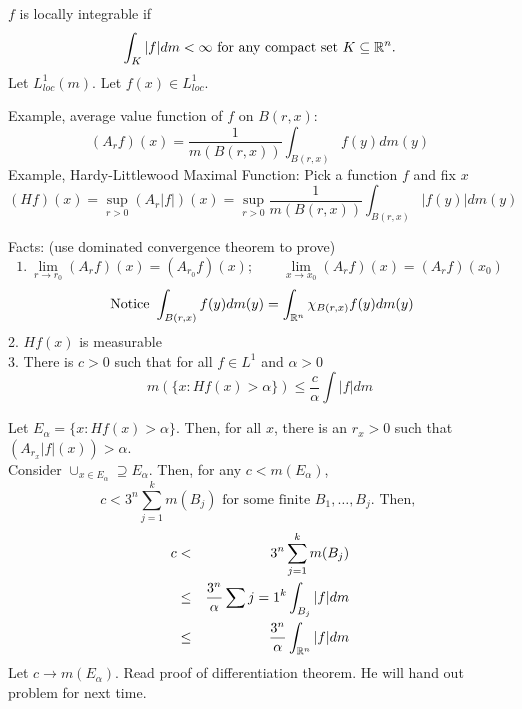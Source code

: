 \begin{dfn}
$f$ is locally integrable if 
\[
\int_K |f|d m < \infty \text{ for any compact set } K \subseteq {\mathbb R}^n. 
\]	
Let $L_{loc}^{1} (m)$. Let $f(x) \in L^{1}_{loc}$.
\end{dfn}
Example, average value function of $f$ on $B(r,x)$: $$ (A_r f )(x) = \frac{1}{m(B(r,x))} \int_{B(r,x)} f(y) dm(y)$$
Example, Hardy-Littlewood Maximal Function: Pick a function $f$ and fix $x$
$$
(Hf)(x) = \sup_{r>0}(A_r |f|)(x) = \sup_{r>0} \frac{1}{m(B(r,x))} \int_{B(r,x)} |f(y)| d m (y)
$$

Facts: (use dominated convergence theorem to prove)
\[
1. \ \lim_{r \rightarrow r_0} (A_r f)(x) = (A_{r_0}f)(x); \qquad \lim_{x \rightarrow x_0}(A_r f)(x) = (A_r f)(x_0)
\]
$$\text{ Notice  }\int_{B(r,x)}f(y)dm(y) = \int_{{\mathbb R}^n} \chi_{B(r,x)}f(y) dm(y)$$
2. $Hf(x)$ is measurable \\
3. There is $c> 0$ such that for all $f \in L^1$ and $\alpha > 0$
\[
m(\{ x: Hf(x)> \alpha \}) \leq \frac{c}{\alpha} \int |f| d m
\]
\begin{pf}[proof of 3]
	Let $E_\alpha = \{ x: Hf(x) > \alpha \}$. Then, for all $x$, there is an $r_x>0$ such that $(A_{r_x}|f|(x)) > \alpha$. \\
	Consider $\cup_{x \in E_{\alpha}} \supseteq E_{\alpha}$. Then, for any $c < m(E_{\alpha})$, 
	\[
	c < 3^n \sum_{j=1}^k m(B_j) \text{ for some finite } B_1, \dots, B_j. \text{ Then, }
	\] 
	\begin{eqnarray*}
	c & < & 	3^n \sum_{j=1}^k m(B_j) \\
	& \leq & \frac{3^n}{\alpha} \sum{j=1}^k \int_{B_j} |f| d m \\
	& \leq &  \frac{3^n}{\alpha} \int_{{\mathbb R}^n} |f| d m
	\end{eqnarray*}
	Let $c \rightarrow m(E_{\alpha})$. 
	Read proof of differentiation theorem. He will hand out problem for next time. 
 \end{pf}
 
